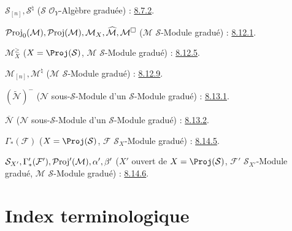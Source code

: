 $\mathcal{S}_{[n]},\mathcal{S}^{\natural}$
($\mathcal{S}$ $\mathcal{O}_Y$-Algèbre graduée) : \hyperref[II.8.7.2-fr]{8.7.2}.

$\mathcal{P}\!\operatorname{roj}_0(\mathcal{M}),\mathcal{P}\!\operatorname{roj}(\mathcal{M}),\mathcal{M}_X,
\widehat{\mathcal{M}},\mathcal{M}^{\square}$
($\mathcal{M}$ $\mathcal{S}$-Module gradué) : \hyperref[II.8.12.1-fr]{8.12.1}.

$\mathcal{M}_X^\geq$
($X=\Proj(\mathcal{S})$, $\mathcal{M}$ $\mathcal{S}$-Module gradué) : \hyperref[II.8.12.5-fr]{8.12.5}.

$\mathcal{M}_{[n]},\mathcal{M}^{\natural}$
($\mathcal{M}$ $\mathcal{S}$-Module gradué) : \hyperref[II.8.12.9-fr]{8.12.9}.

$(\widetilde{\mathcal{N}})^-$
($\mathcal{N}$ sous-$\mathcal{S}$-Module d'un $\mathcal{S}$-Module gradué) : \hyperref[II.8.13.1-fr]{8.13.1}.

$\overline{\mathcal{N}}$
($\mathcal{N}$ sous-$\mathcal{S}$-Module d'un $\mathcal{S}$-Module gradué) : \hyperref[II.8.13.2-fr]{8.13.2}.

$\Gamma_*(\mathcal{F})$
($X=\Proj(\mathcal{S})$, $\mathcal{F}$ $\mathcal{S}_X$-Module gradué) : \hyperref[II.8.14.5-fr]{8.14.5}.

$\mathcal{S}_{X'},\Gamma'_*(\mathcal{F}'),\mathcal{P}\!\operatorname{roj}'(\mathcal{M}),
\alpha',\beta'$
($X'$ ouvert de $X=\Proj(\mathcal{S})$, $\mathcal{F}'$ $\mathcal{S}_{X'}$-Module gradué,
$\mathcal{M}$ $\mathcal{S}$-Module gradué) : \hyperref[II.8.14.6-fr]{8.14.6}.

\endgroup

\clearpage
{}
\thispagestyle{plain}
{}
\section*{Index terminologique}

\begingroup
\small
\setlength{\parindent}{0pt}
\setlength{\parskip}{2pt}
\newcommand{\egaTerme}[2]{\textbf{#1} : #2.\par}

